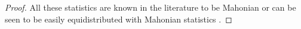 \documentclass{amsart}
\theoremstyle{definition}
\begin{document}
\begin{proof}
  All these statistics are known in the literature to be Mahonian or can be seen to be easily equidistributed with Mahonian statistics \cite{BabsonSteingrimsson,FoataHan,FoataZeilberger,MacMahon,Petersensortingindex,Rodrigues,ShareshianWachs2007,Stanley2011}.

\end{proof}
\end{document}
